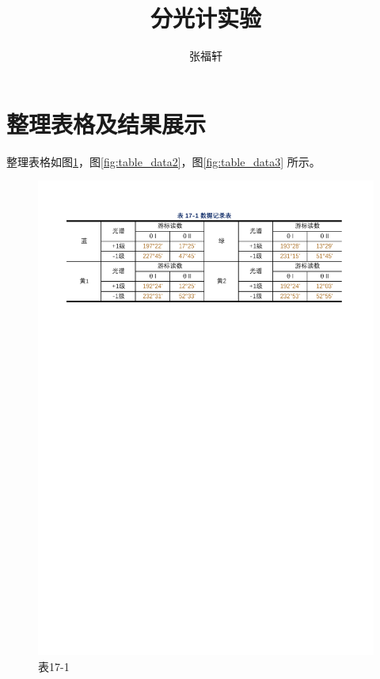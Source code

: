 \documentclass[12pt]{article}
\title{分光计实验}%
\author{张福轩}
\begin{document}
\maketitle

\section{\normalfont 整理表格及结果展示}

整理表格如图\ref{fig:table_data1}，图\ref{fig:table_data2}，图\ref{fig:table_data3} 所示。

\begin{figure}[H] %
    \centering
    \includegraphics[width=\textwidth]{./figures/表17-1.pdf} 
    \caption{表17-1}
    \label{fig:table_data1}
\end{figure}
\end{document}
